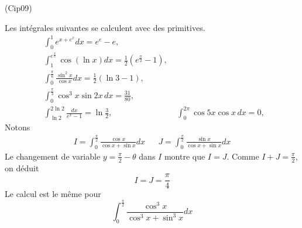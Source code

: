 \begin{tiny}(Cip09)\end{tiny}
Les int{\'e}grales suivantes se calculent avec des primitives.
\begin{align*}
&\int_{0}^{1}e^{x+e^{x}}dx= e^{e}-e,\;\\
&\int_{1}^{e^{\frac{\pi}{2}}}\cos(\ln x)dx = \frac{1}{2}\left(e^{\frac{\pi}{2}}-1 \right),\;\\
&\int_{0}^{\frac{\pi }{6}}\frac{\sin ^{2}x}{\cos x}dx = \frac{1}{2}\left(\ln 3 -1 \right),\;\\
&\int_0^{\frac{\pi }{3}}\cos ^{3}x\sin 2x\,dx = \frac{31}{80},\;\\
&\int_{\ln 2}^{2\ln 2}\frac{dx}{e^{x}-1}= \ln\frac{3}{2},\;
&\int_{0}^{2\pi }\cos5x\cos x\,dx = 0,\;
\end{align*}
Notons 
\begin{align*}
 I = \int_{0}^{\frac{\pi }{2}}\frac{\cos x}{\cos x+\sin x}dx 
& &
 J = \int_{0}^{\frac{\pi }{2}}\frac{\sin x}{\cos x+\sin x}dx
\end{align*}
Le changement de variable $y=\frac{\pi}{2}-\theta$ dans $I$ montre que $I=J$. Comme $I+J=\frac{\pi}{2}$, on déduit
\begin{displaymath}
 I= J = \frac{\pi}{4}
\end{displaymath}
Le calcul est le même pour
\begin{displaymath}
\int_{0}^{\frac{\pi }{2}}\frac{\cos ^{3}x}{\cos ^{3}x+\sin^{3}x}dx 
\end{displaymath}
